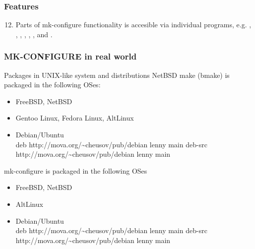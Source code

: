 \documentclass[hyperref={colorlinks=true}]{beamer}
\begin{document}

\begin{frame}[fragile,t]
  \frametitle{Features}
  \begin{block}{}
  \begin{enumerate}
    \setcounter{enumi}{11}
    \item Parts of mk-configure functionality is
      accesible via individual programs, e.g.  ,
      ,
      , ,
      ,
      ,  and
      .
  \end{enumerate}
  \end{block}
\end{frame}


\begin{frame}[fragile,t]
  \frametitle{MK-CONFIGURE in real world}
  \begin{block}{Packages in UNIX-like system and distributions}
    NetBSD make (bmake) is packaged in the following OSes:
    \begin{itemize}
    \item FreeBSD, NetBSD
    \item Gentoo Linux, Fedora Linux, AltLinux
    \item Debian/Ubuntu\\
      deb http://mova.org/\~{}cheusov/pub/debian lenny main
      deb-src http://mova.org/\~{}cheusov/pub/debian lenny main
    \end{itemize}
    mk-configure is packaged in the following OSes
    \begin{itemize}
    \item FreeBSD, NetBSD
    \item AltLinux
    \item Debian/Ubuntu\\
      deb http://mova.org/\~{}cheusov/pub/debian lenny main
      deb-src http://mova.org/\~{}cheusov/pub/debian lenny main
    \end{itemize}
  \end{block}
\end{frame}

\end{document}
